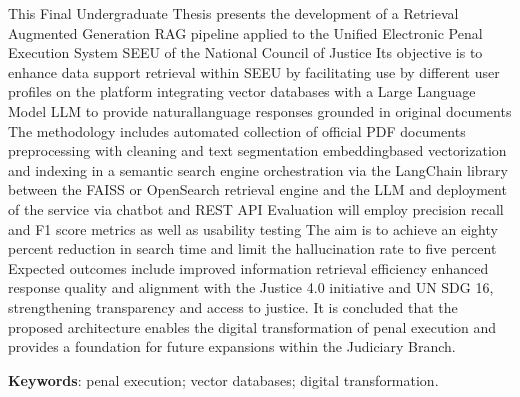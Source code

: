 %
%

\begin{ABSTRACT}
\thispagestyle{empty}
\OnehalfSpacing

\noindent This Final Undergraduate Thesis presents the development of a Retrieval Augmented Generation RAG pipeline applied to the Unified Electronic Penal Execution System SEEU of the National Council of Justice Its objective is to enhance data support retrieval within SEEU by facilitating use by different user profiles on the platform integrating vector databases with a Large Language Model LLM to provide naturallanguage responses grounded in original documents The methodology includes automated collection of official PDF documents preprocessing with cleaning and text segmentation embeddingbased vectorization and indexing in a semantic search engine orchestration via the LangChain library between the FAISS or OpenSearch retrieval engine and the LLM and deployment of the service via chatbot and REST API Evaluation will employ precision recall and F1 score metrics as well as usability testing The aim is to achieve an eighty percent reduction in search time and limit the hallucination rate to five percent Expected outcomes include improved information retrieval efficiency enhanced response quality and alignment with the Justice 4.0 initiative and UN SDG 16, strengthening transparency and access to justice. It is concluded that the proposed architecture enables the digital transformation of penal execution and provides a foundation for future expansions within the Judiciary Branch.

\SingleSpacing
\noindent \textbf{Keywords}: penal execution; vector databases; digital transformation.

\end{ABSTRACT}
